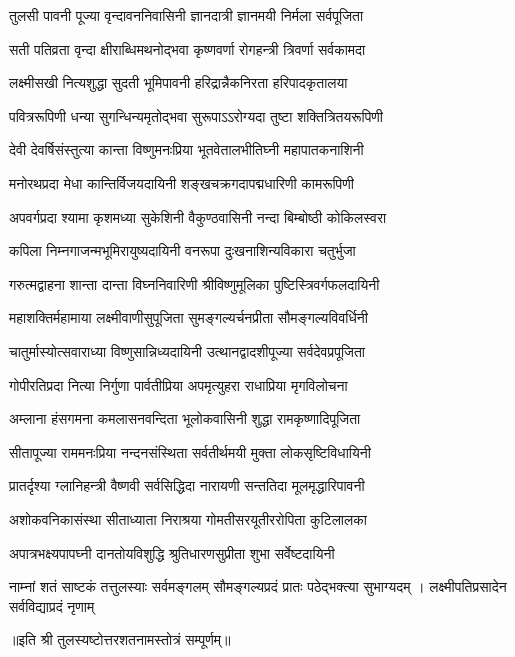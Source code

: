 


{तुलसी पावनी पूज्या वृन्दावननिवासिनी}
{ज्ञानदात्री ज्ञानमयी निर्मला सर्वपूजिता}%

\twolineshloka
{सती पतिव्रता वृन्दा क्षीराब्धिमथनोद्भवा}
{कृष्णवर्णा रोगहन्त्री त्रिवर्णा सर्वकामदा}%

\twolineshloka
{लक्ष्मीसखी नित्यशुद्धा सुदती भूमिपावनी}
{हरिद्रान्नैकनिरता हरिपादकृतालया}%

\twolineshloka
{पवित्ररूपिणी धन्या सुगन्धिन्यमृतोद्भवा}
{सुरूपाऽऽरोग्यदा तुष्टा शक्तित्रितयरूपिणी}%

\twolineshloka
{देवी देवर्षिसंस्तुत्या कान्ता विष्णुमनःप्रिया}
{भूतवेतालभीतिघ्नी महापातकनाशिनी}%

\twolineshloka
{मनोरथप्रदा मेधा कान्तिर्विजयदायिनी}
{शङ्खचक्रगदापद्मधारिणी कामरूपिणी}%

\twolineshloka
{अपवर्गप्रदा श्यामा कृशमध्या सुकेशिनी}
{वैकुण्ठवासिनी नन्दा बिम्बोष्ठी कोकिलस्वरा}%

\twolineshloka
{कपिला निम्नगाजन्मभूमिरायुष्यदायिनी}
{वनरूपा दुःखनाशिन्यविकारा चतुर्भुजा}%

\twolineshloka
{गरुत्मद्वाहना शान्ता दान्ता विघ्ननिवारिणी}
{श्रीविष्णुमूलिका पुष्टिस्त्रिवर्गफलदायिनी}%

\twolineshloka
{महाशक्तिर्महामाया लक्ष्मीवाणीसुपूजिता}
{सुमङ्गल्यर्चनप्रीता सौमङ्गल्यविवर्धिनी}%

\twolineshloka
{चातुर्मास्योत्सवाराध्या विष्णुसान्निध्यदायिनी}
{उत्थानद्वादशीपूज्या सर्वदेवप्रपूजिता}%

\twolineshloka
{गोपीरतिप्रदा नित्या निर्गुणा पार्वतीप्रिया}
{अपमृत्युहरा राधाप्रिया मृगविलोचना}%

\twolineshloka
{अम्लाना हंसगमना कमलासनवन्दिता}
{भूलोकवासिनी शुद्धा रामकृष्णादिपूजिता}%

\twolineshloka
{सीतापूज्या राममनःप्रिया नन्दनसंस्थिता}
{सर्वतीर्थमयी मुक्ता लोकसृष्टिविधायिनी}%

\twolineshloka
{प्रातर्दृश्या ग्लानिहन्त्री वैष्णवी सर्वसिद्धिदा}
{नारायणी सन्ततिदा मूलमृद्धारिपावनी}%

\twolineshloka
{अशोकवनिकासंस्था सीताध्याता निराश्रया}
{गोमतीसरयूतीररोपिता कुटिलालका}%

\twolineshloka
{अपात्रभक्ष्यपापघ्नी दानतोयविशुद्धि}
{श्रुतिधारणसुप्रीता शुभा सर्वेष्टदायिनी}%

\threelineshloka
{नाम्नां शतं साष्टकं तत्तुलस्याः सर्वमङ्गलम्}
{सौमङ्गल्यप्रदं प्रातः पठेद्भक्त्या सुभाग्यदम्} ।
{लक्ष्मीपतिप्रसादेन सर्वविद्याप्रदं नृणाम्}%

{॥इति श्री तुलस्यष्टोत्तरशतनामस्तोत्रं सम्पूर्णम्॥}